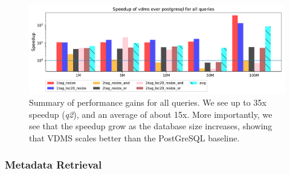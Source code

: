 \begin{figure}[ht!]
\centering
\includegraphics[width=\textwidth]{figures/plot_th_56_query_times_speedup_postgresql}
\caption{Summary of performance gains for all queries.
We see up to 35x speedup (\textit{q2}), and an average of about 15x.
More importantly, we see that the speedup grow as the database size increases,
showing that VDMS scales better than the PostGreSQL baseline.}
\label{fig:summary_postgresql}
\end{figure}

\subsubsection{Metadata Retrieval}

